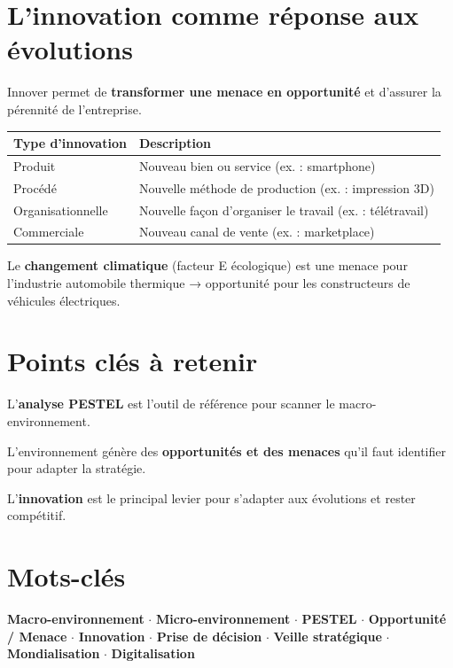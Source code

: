 \documentclass[11pt,a4paper]{article}
\begin{document}
\section*{L'innovation comme réponse aux évolutions}

\begin{keybox}
Innover permet de \textbf{transformer une menace en opportunité} et d'assurer la pérennité de l'entreprise.
\end{keybox}

\begin{center}
\begin{tabular}{|l|l|}
\hline
\textbf{Type d'innovation} & \textbf{Description} \\
\hline
Produit & Nouveau bien ou service (ex. : smartphone) \\
Procédé & Nouvelle méthode de production (ex. : impression 3D) \\
Organisationnelle & Nouvelle façon d'organiser le travail (ex. : télétravail) \\
Commerciale & Nouveau canal de vente (ex. : marketplace) \\
\hline
\end{tabular}
\end{center}

\begin{exbox}
Le \textbf{changement climatique} (facteur E écologique) est une menace pour l'industrie automobile thermique → opportunité pour les constructeurs de véhicules électriques.
\end{exbox}

\section*{Points clés à retenir}

\begin{keybox}
L'\textbf{analyse PESTEL} est l'outil de référence pour scanner le macro-environnement.
\end{keybox}
\vspace{3pt}
\begin{keybox}
L'environnement génère des \textbf{opportunités et des menaces} qu'il faut identifier pour adapter la stratégie.
\end{keybox}
\vspace{3pt}
\begin{keybox}
L'\textbf{innovation} est le principal levier pour s'adapter aux évolutions et rester compétitif.
\end{keybox}

\section*{Mots-clés}
\textcolor{mainColor}{\textbf{Macro-environnement}} $\cdot$
\textcolor{mainColor}{\textbf{Micro-environnement}} $\cdot$
\textcolor{mainColor}{\textbf{PESTEL}} $\cdot$
\textcolor{mainColor}{\textbf{Opportunité / Menace}} $\cdot$
\textcolor{mainColor}{\textbf{Innovation}} $\cdot$
\textcolor{mainColor}{\textbf{Prise de décision}} $\cdot$
\textcolor{mainColor}{\textbf{Veille stratégique}} $\cdot$
\textcolor{mainColor}{\textbf{Mondialisation}} $\cdot$
\textcolor{mainColor}{\textbf{Digitalisation}}
\end{document}
